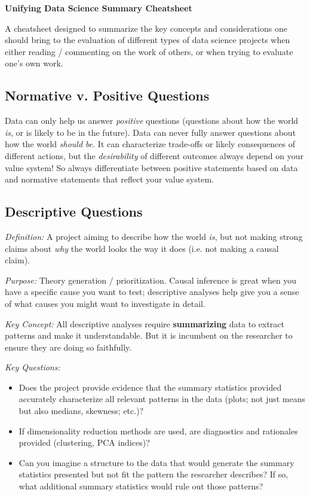 \documentclass[12pt]{article}
\begin{document}
\begin{center}
\Large \textbf{Unifying Data Science Summary Cheatsheet}
\end{center}

A cheatsheet designed to summarize the key concepts and considerations one should bring to the evaluation of different types of data science projects when either reading / commenting on the work of others, or when trying to evaluate one's own work.

\subsection*{Normative v. Positive Questions}
Data can only help us answer \emph{positive} questions (questions about how the world \emph{is}, or is likely to be in the future). Data can never fully answer questions about how the world \emph{should be}. It can characterize trade-offs or likely consequences of different actions, but the \emph{desirability} of different outcomes always depend on your value system! So always differentiate between positive statements based on data and normative statements that reflect your value system.

\subsection*{Descriptive Questions}
\emph{Definition:} A project aiming to describe how the world \emph{is}, but not making strong claims about \emph{why} the world looks the way it does (i.e. not making a causal claim).

\emph{Purpose:} Theory generation / prioritization. Causal inference is great when you have a specific cause you want to test; descriptive analyses help give you a sense of what causes you might want to investigate in detail.

\emph{Key Concept:} All descriptive analyses require \textbf{summarizing} data to extract patterns and make it understandable. But it is incumbent on the researcher to ensure they are doing so faithfully.

\emph{Key Questions:}
\begin{itemize}
    \item Does the project provide evidence that the summary statistics provided accurately characterize all relevant patterns in the data (plots; not just means but also medians, skewness; etc.)?
    \item If dimensionality reduction methods are used, are diagnostics and rationales provided (clustering, PCA indices)?
    \item Can you imagine a structure to the data that would generate the summary statistics presented but not fit the pattern the researcher describes? If so, what additional summary statistics would rule out those patterns?
\end{itemize}
\end{document}

